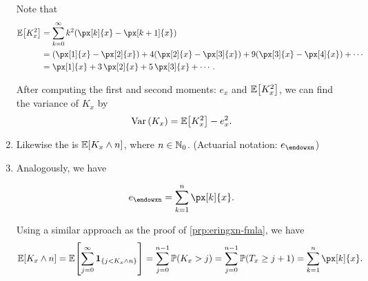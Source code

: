 \begin{enumerate}
\begin{pf}
Note that
\begin{align*}
\expv{K_x^2}
&=\sum_{k=0}^{\infty}k^2(\px[k]{x}-\px[k+1]{x})\\
&=(\px[1]{x}-\px[2]{x})+4(\px[2]{x}-\px[3]{x})+9(\px[3]{x}-\px[4]{x})+\dotsb\\
&=\px[1]{x}+3\,\px[2]{x}+5\,\px[3]{x}+\dotsb.
\end{align*}
\end{pf}

After computing the first and second moments: \(e_x\) and \(\mathbb{E}\qty[K_x^2]\), we
can find the variance of \(K_x\) by
\[
\operatorname{Var}\qty(K_x)=\mathbb{E}\qty[K_x^2]-e_x^2.
\]
\item Likewise the  is \(\mathbb{E}\qty[K_x\wedge
n]\), where \(n\in\mathbb{N}_0\). (Actuarial notation: \(e_{\endowxn}\))
\item Analogously, we have
\begin{proposition}
\label{prp:exn-fmla}
\[
e_{\endowxn}=\sum_{k=1}^{n}\px[k]{x}.
\]
\end{proposition}
\begin{pf}
Using a similar approach as the proof of \cref{prp:eringxn-fmla}, we have
\[
\expv{K_x\wedge n}
=\expv{\sum_{j=0}^{\infty}\indicset{j<K_x \wedge n}}
=\sum_{j=0}^{n-1}\prob{K_x>j}
=\sum_{j=0}^{n-1}\prob{T_x\ge j+1}
=\sum_{k=1}^{n}\px[k]{x}.
\]
\end{pf}
\end{enumerate}
